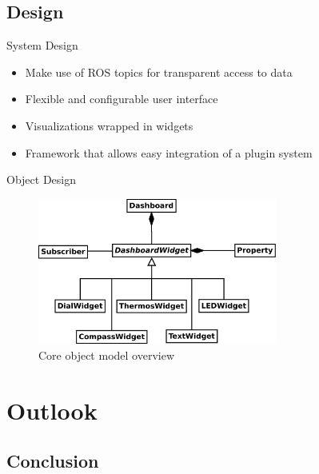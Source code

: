 \documentclass[compress]{beamer}
\begin{document}
\subsection{Design}

\begin{frame}{System Design}
\begin{itemize}
\item Make use of ROS topics for transparent access to data
\item Flexible and configurable user interface
\item Visualizations wrapped in widgets
\item Framework that allows easy integration of a plugin system
\end{itemize}
\end{frame}

\begin{frame}{Object Design}
\begin{figure}
    \centering
    \includegraphics[width=0.7\textwidth]{diagrams/class_overview}
    \caption[Core object model overview]{Core object model overview}
\end{figure}
\end{frame}


\section{Outlook}

\subsection{Conclusion}
\end{document}
